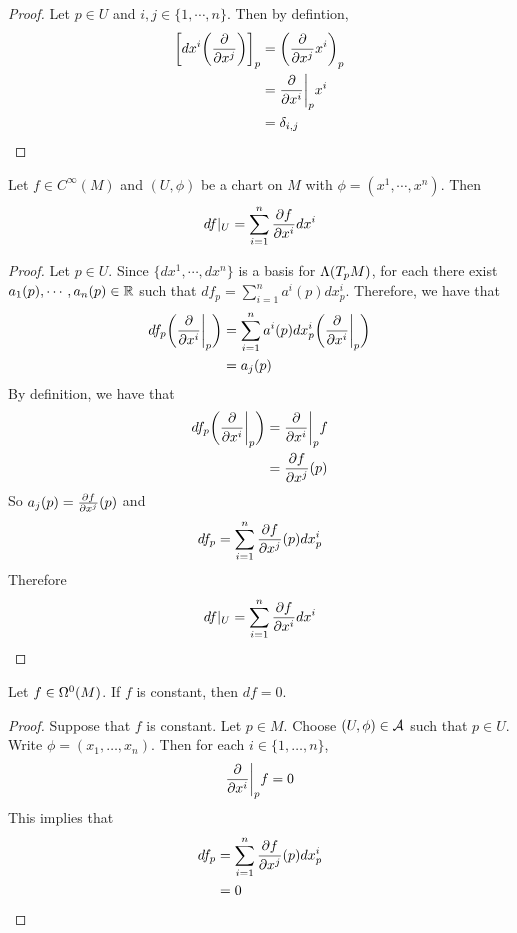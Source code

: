 \documentclass{book}
\begin{document}
	\begin{proof}
		Let $p \in U$ and $i,j \in \{1, \cdots, n\}$. Then  by defintion,
		\begin{align*}
			\bigg[ dx^i \bigg (\frac{\partial}{\partial x^j} \bigg ) \bigg]_p 
			& = \bigg(\frac{\partial}{\partial x^j} x^i \bigg )_p \\
			& = \frac{\partial}{\partial x^i} \bigg|_p x^i \\
			& = \delta_{i,j} \\
		\end{align*}
	\end{proof}

	\begin{ex}
		Let $f \in C^{\infty}(M)$ and $(U, \phi)$ be a chart on $M$ with $\phi = (x^1, \cdots, x^n)$. Then $$df|_U = \sum_{i=1}^n \frac{\partial f}{\partial x^i} dx^i$$
	\end{ex}

	\begin{proof}
		Let $p \in U$. Since $\{dx^1, \cdots, dx^n\}$ is a basis for $\Lambda(T_pM)$, for each there exist $a_1(p), \cdots, a_n(p) \in \mathbb{R}$ such that $df_p = \sum\limits_{i=1}^n a^i(p)dx^i_p$. Therefore, we have that 
		\begin{align*}
			df_p \bigg(\frac{\partial}{\partial x^i} \bigg|_p \bigg) 
			& = \sum\limits_{i=1}^n a^i(p)dx^i_p \bigg(\frac{\partial}{\partial x^i} \bigg|_p \bigg)  \\
			& =  a_j(p)
		\end{align*}
		By definition, we have that 
		\begin{align*}
			df_p\bigg(\frac{\partial}{\partial x^i} \bigg|_p \bigg) 
			& = \frac{\partial}{\partial x^i} \bigg|_p f \\ 
			& = \frac{\partial f}{\partial x^j} (p)\\
		\end{align*}
		So $a_j(p) = \frac{\partial f}{\partial x^j} (p)$ and $$df_p = \sum\limits_{i=1}^n \frac{\partial f}{\partial x^j} (p)dx^i_p$$
		Therefore $$df|_U = \sum\limits_{i=1}^n {\frac{\partial f}{\partial x^i}}dx^i$$
	\end{proof}
	
	\begin{ex}
	Let $f \in \Omega^0(M)$. If $f$ is constant, then $df = 0$. 
	\end{ex}
	
	\begin{proof}
	Suppose that $f$ is constant. Let $p \in M$. Choose $(U, \phi) \in \mathcal{A}$ such that $p \in U$. Write $\phi = (x_1, \dots, x_n)$. Then for each $i \in \{1, \dots, n\}$, $$\frac{\partial}{\partial x^i} \bigg|_p f = 0$$ This implies that 
	\begin{align*}
	df_p 
	& = \sum\limits_{i=1}^n \frac{\partial f}{\partial x^j} (p)dx^i_p \\
	& = 0
	\end{align*}
	\end{proof}
	
\end{document}

